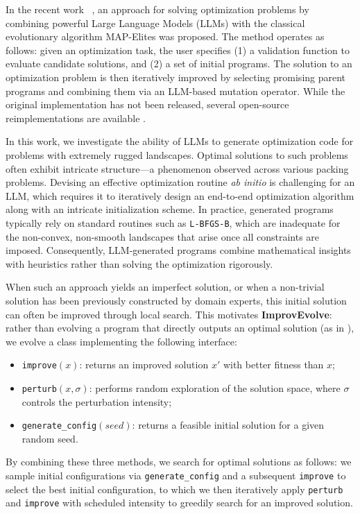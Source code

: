 \documentclass[sigconf]{acmart}
\begin{document}
In the recent work \alphaevolve~\cite{novikov2025alphaevolve}, an approach for solving optimization problems by combining powerful Large Language Models (LLMs) with the classical evolutionary algorithm MAP-Elites \cite{mouret2015illuminatingsearchspacesmapping} was proposed. The method operates as follows: given an optimization task, the user specifies (1) a validation function to evaluate candidate solutions, and (2) a set of initial programs. The solution to an optimization problem is then iteratively improved by selecting promising parent programs and combining them via an LLM-based mutation operator. While the original implementation has not been released, several open-source reimplementations are available \cite{openevolve,lange2025shinkaevolve, assumpção2026codeevolveopensourceevolutionary, khrulkov2025gigaevo}.

In this work, we investigate the ability of LLMs to generate optimization code for problems with extremely rugged landscapes. Optimal solutions to such problems often exhibit intricate structure---a phenomenon observed across various packing problems. Devising an effective optimization routine \emph{ab initio} is challenging for an LLM, which requires it to iteratively design an end-to-end optimization algorithm along with an intricate initialization scheme. In practice, generated programs typically rely on standard routines such as \texttt{L-BFGS-B}, which are inadequate for the non-convex, non-smooth landscapes that arise once all constraints are imposed. Consequently, LLM-generated programs combine mathematical insights with heuristics rather than solving the optimization rigorously.

When such an approach yields an imperfect solution, or when a non-trivial solution has been previously constructed by domain experts, this initial solution can often be improved through local search. This motivates \textbf{ImprovEvolve}: rather than evolving a program that directly outputs an optimal solution (as in \alphaevolve), we evolve a class implementing the following interface:
\begin{itemize}
    \item \texttt{improve}$(x)$: returns an improved solution $x'$ with better fitness than $x$;
    \item \texttt{perturb}$(x, \sigma)$: performs random exploration of the solution space, where $\sigma$ controls the perturbation intensity;
    \item \texttt{generate\allowbreak\_config}$(seed)$: returns a feasible initial solution for a given random seed.
\end{itemize}
By combining these three methods, we search for optimal solutions as follows: we sample initial configurations via \texttt{generate\allowbreak\_config} and a subsequent \texttt{improve} to select the best initial configuration, to which we then iteratively apply \texttt{perturb} and \texttt{improve} with scheduled intensity to greedily search for an improved solution.
\end{document}
